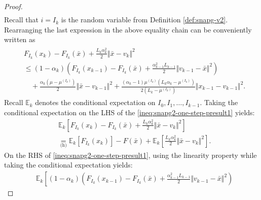 \documentclass[12pt]{article}
\begin{document}
\begin{proof}
{\begin{align*}
            \end{align*}
            }
            Recall that $i = I_k$ is the random variable from Definition \ref{def:snapg-v2}. 
            Rearranging the last expression in the above equality chain can be conveniently written as
            \begin{align}
                \begin{split}
                    & F_{I_k}(x_{k}) - F_{I_k}(\bar x) + \frac{L_k\alpha_k^2}{2}\Vert \bar x - v_k\Vert^2 
                    \\ &\le 
                    (1 - \alpha_k)\left(
                        F_{I_k}(x_{k - 1}) - F_{I_k}(\bar x) + \frac{\alpha_{k - 1}^2L_{k - 1}}{2}\Vert v_{k - 1} - \bar x\Vert^2
                    \right) 
                        \\ &\quad 
                        + \frac{\alpha_k(\mu - \mu^{(I_k)})}{2} \Vert \bar x - v_{k - 1}\Vert^2
                        + \frac{(\alpha_k - 1)\mu^{(I_k)}\left(L_k\alpha_k - \mu^{(I_k)}\right)}{2\left(L_k - \mu^{(I_k)}\right)}\Vert x_{k - 1} - v_{k - 1} \Vert^2. 
                \end{split}
            \label{ineq:snapg2-one-step-presult1}\end{align}
            Recall $\mathbb E_k$ denotes the conditional expectation on $I_0, I_1, \ldots, I_{k - 1}$. 
            Taking the conditional expectation on the LHS of the \eqref{ineq:snapg2-one-step-presult1} yields: 
            \begin{align*}
                & \mathbb E_k\left[
                    F_{I_k}(x_{k}) - F_{I_k}(\bar x) + \frac{L_k\alpha_k^2}{2}\Vert \bar x - v_k\Vert^2 
                \right]
                \\
                &\underset{\text{(h)}}{=}
                \mathbb E_k\left[F_{I_k}(x_{k})\right] 
                - F(\bar x) 
                + \mathbb E_k\left[
                    \frac{L_k\alpha_k^2}{2}\Vert \bar x - v_k\Vert^2 
                \right]. 
            \end{align*}
            On the RHS of \eqref{ineq:snapg2-one-step-presult1}, using the linearity property while taking the conditional expectation yields: 
            {\allowdisplaybreaks
            \begin{align*}
                & \mathbb E_k\left[
                    (1 - \alpha_k)\left(
                        F_{I_k}(x_{k - 1}) - F_{I_k}(\bar x) + \frac{\alpha_{k - 1}^2L_{k - 1}}{2}\Vert v_{k - 1} - \bar x\Vert^2
                    \right)

\end{align*}}
\end{proof}
\end{document}
